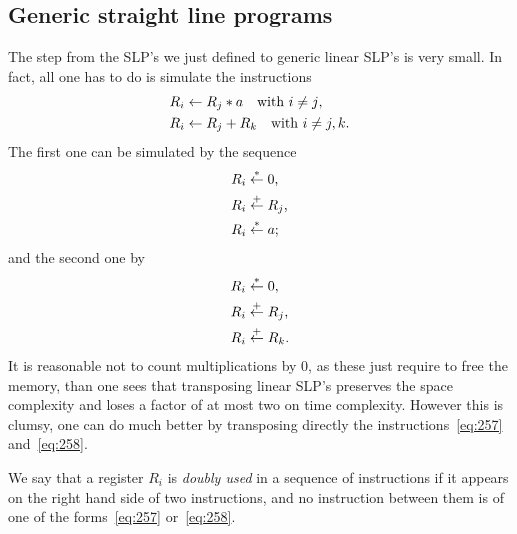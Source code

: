 \subsection{Generic straight line programs}
\label{sec:gener-stra-line}
The step from the SLP's we just defined to generic linear SLP's is
very small. In fact, all one has to do is simulate the instructions
\begin{align}
  \label{eq:257}
  R_i &\leftarrow R_j*a\quad\text{with $i\ne j$,}\\
  \label{eq:258}
  R_i &\leftarrow R_j + R_k\quad\text{with $i\ne j,k$.}
\end{align}
The first one can be simulated by the sequence
\begin{equation}
  \label{eq:259}
  \begin{aligned}
    R_i &\overset{*}{\leftarrow} 0\text{,}\\
    R_i &\overset{+}{\leftarrow} R_j\text{,}\\
    R_i &\overset{*}{\leftarrow} a\text{;}
  \end{aligned}
\end{equation}
and the second one by
\begin{equation}
  \label{eq:260}
  \begin{aligned}
    R_i &\overset{*}{\leftarrow} 0\text{,}\\
    R_i &\overset{+}{\leftarrow} R_j\text{,}\\
    R_i &\overset{+}{\leftarrow} R_k\text{.}
  \end{aligned}
\end{equation}
It is reasonable not to count multiplications by $0$, as these just
require to free the memory, than one sees that transposing linear
SLP's preserves the space complexity and loses a factor of at most two
on time complexity. However this is clumsy, one can do much better by
transposing directly the instructions~\eqref{eq:257}
and~\eqref{eq:258}.

\begin{definition}
  We say that a register $R_i$ is \emph{doubly used}
  in a sequence of instructions if it appears on the right hand side
  of two instructions, and no instruction between them is of one of
  the forms~\eqref{eq:257} or~\eqref{eq:258}.
\end{definition}

